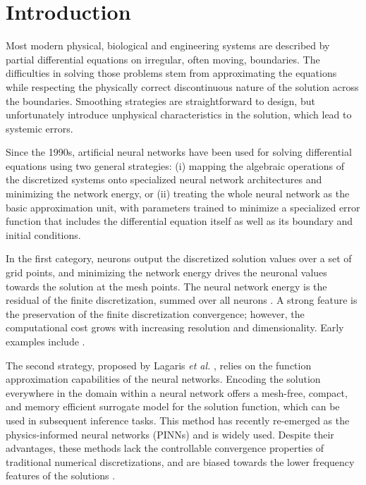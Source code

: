 \documentclass{article}
\begin{document}
\section{Introduction}
Most modern physical, biological and engineering systems are described by partial differential equations on irregular, often moving, boundaries. The difficulties in solving those problems stem from approximating the equations while respecting the physically correct discontinuous nature of the solution across the boundaries. Smoothing strategies are straightforward to design, but unfortunately introduce unphysical characteristics in the solution, which lead to systemic errors.

Since the 1990s, artificial neural networks have been used for solving differential equations using two general strategies: (i) mapping the algebraic operations of the discretized systems onto specialized neural network architectures and minimizing the network energy, or (ii) treating the whole neural network as the basic approximation unit, with parameters trained to minimize a specialized error function that includes the differential equation itself as well as its boundary and initial conditions. 

In the first category, neurons output the discretized solution values over a set of grid points, and minimizing the network energy drives the neuronal values towards the solution at the mesh points. The neural network energy is the residual of the finite discretization, summed over all neurons \cite{lee1990neural}. A strong feature is the preservation of the finite discretization convergence; however, the computational cost grows with increasing resolution and dimensionality. Early examples include \cite{gobovic1993design,chua1988cellular,chua1988cellularA}.

The second strategy, proposed by Lagaris \textit{et al.} \cite{lagaris1998artificial}, relies on the function approximation capabilities of the neural networks. Encoding the solution everywhere in the domain within a neural network offers a mesh-free, compact, and memory efficient surrogate model for the solution function, which can be used in subsequent inference tasks. This method has recently re-emerged as the physics-informed neural networks (PINNs) \cite{RAISSI2019686} and is widely used. Despite their advantages, these methods lack the controllable convergence properties of traditional numerical discretizations, and are biased towards the lower frequency features of the solutions \cite{wang2022and,rahaman2019spectral,krishnapriyan2021characterizing}.
\end{document}
